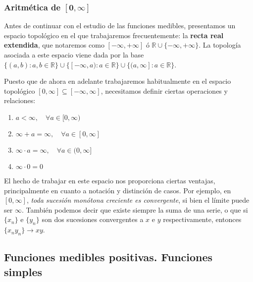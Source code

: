 \documentclass[11pt, a4paper]{article}
\newcommand{\bm}[1]{\boldsymbol{#1}}
\newcommand{\xn}{\{x_n\}}
\theoremstyle{theorem-style}
\theoremstyle{definition-style}
\theoremstyle{remark-style}
\theoremstyle{example-style}
\newenvironment{nlist}
{\begin{enumerate}
    \renewcommand\labelenumi{(\emph{\roman{enumi})}}}
  {\end{enumerate}}
\begin{document}

\subsubsection*{Aritmética de $\bm{[0,\infty]}$}

Antes de continuar con el estudio de las funciones medibles, presentamos un espacio topológico en el que trabajaremos frecuentemente: la \textbf{recta real extendida}, que notaremos como $[-\infty,+\infty]$ ó $\mathbb{R} \cup \{-\infty, +\infty\}$. La topología asociada a este espacio viene dada por la base $\{(a,b): a,b \in \mathbb{R}\} \cup \{[-\infty, a): a \in \mathbb{R}\} \cup \{(a,\infty]: a \in \mathbb{R}\}$.

Puesto que de ahora en adelante trabajaremos habitualmente en el espacio topológico $[0,\infty] \subseteq [-\infty,\infty]$, necesitamos definir ciertas operaciones y relaciones:
\begin{nlist}
\item $a < \infty, \quad \forall a \in [0,\infty)$
\item $\infty + a = \infty, \quad \forall a \in [0,\infty]$
\item $\infty \cdot a = \infty, \quad \forall a \in (0,\infty]$
\item $\infty \cdot 0 = 0$
\end{nlist}

El hecho de trabajar en este espacio nos proporciona ciertas ventajas, principalmente en cuanto a notación y distinción de casos. Por ejemplo, en $[0, \infty]$, \textit{toda sucesión monótona creciente es convergente}, si bien el límite puede ser $\infty$. También podemos decir que existe siempre la suma de una serie, o que si $\xn$ e $\{y_n\}$ son dos sucesiones convergentes a $x$ e $y$ respectivamente, entonces $\{x_ny_n\} \to xy$.



\subsection{Funciones medibles positivas. Funciones simples}
\end{document}
